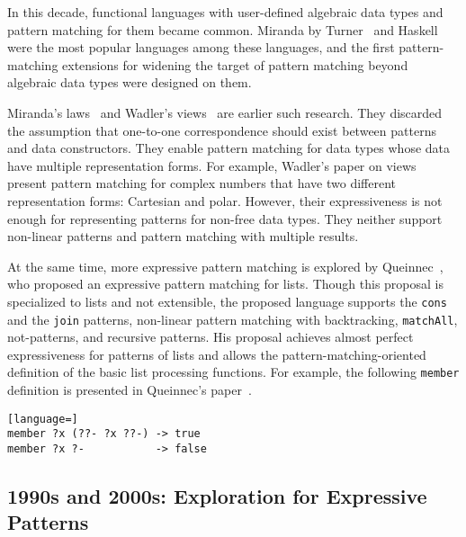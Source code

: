 \documentclass{article}
\begin{document}
In this decade, functional languages with user-defined algebraic data types and pattern matching for them became common.
Miranda by Turner~\cite{turner1985miranda} and Haskell~\cite{Hudak07ahistory} were the most popular languages among these languages, and the first pattern-matching extensions for widening the target of pattern matching beyond algebraic data types were designed on them.

Miranda's laws~\cite{thompson1986laws,thompson1990lawful} and Wadler's views~\cite{wadler1987views} are earlier such research.
They discarded the assumption that one-to-one correspondence should exist between patterns and data constructors.
They enable pattern matching for data types whose data have multiple representation forms.
For example, Wadler's paper on views~\cite{wadler1987views} present pattern matching for complex numbers that have two different representation forms: Cartesian and polar.
However, their expressiveness is not enough for representing patterns for non-free data types.
They neither support non-linear patterns and pattern matching with multiple results.

At the same time, more expressive pattern matching is explored by Queinnec~\cite{queinnec1990compilation}, who proposed an expressive pattern matching for lists.
Though this proposal is specialized to lists and not extensible, the proposed language supports the \texttt{cons} and the \texttt{join} patterns, non-linear pattern matching with backtracking, \texttt{matchAll}, not-patterns, and recursive patterns.
His proposal achieves almost perfect expressiveness for patterns of lists and allows the pattern-matching-oriented definition of the basic list processing functions.
For example, the following \texttt{member} definition is presented in Queinnec's paper~\cite{queinnec1990compilation}.

\begin{lstlisting}[language=]
member ?x (??- ?x ??-) -> true
member ?x ?-           -> false
\end{lstlisting}

\subsection{1990s and 2000s: Exploration for Expressive Patterns}
\end{document}

